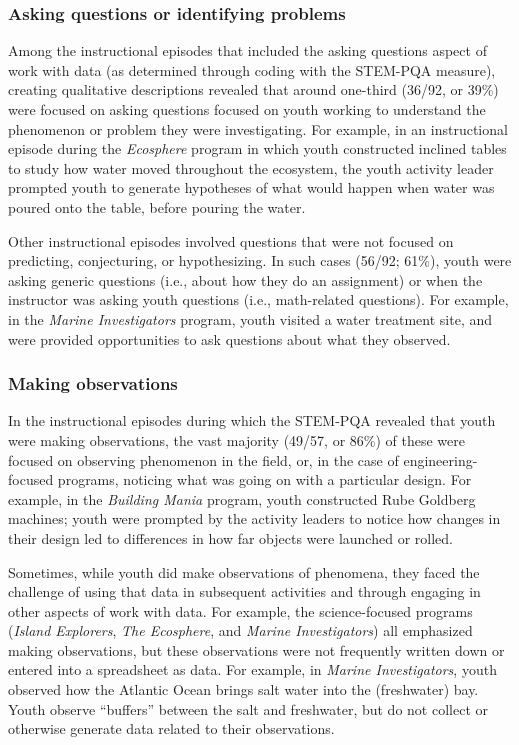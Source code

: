 \documentclass[]{book}
\theoremstyle{definition}
\theoremstyle{definition}
\theoremstyle{definition}
\theoremstyle{remark}
\begin{document}
\subsubsection{Asking questions or identifying
problems}\label{asking-questions-or-identifying-problems}

Among the instructional episodes that included the asking questions
aspect of work with data (as determined through coding with the STEM-PQA
measure), creating qualitative descriptions revealed that around
one-third (36/92, or 39\%) were focused on asking questions focused on
youth working to understand the phenomenon or problem they were
investigating. For example, in an instructional episode during the
\emph{Ecosphere} program in which youth constructed inclined tables to
study how water moved throughout the ecosystem, the youth activity
leader prompted youth to generate hypotheses of what would happen when
water was poured onto the table, before pouring the water.

Other instructional episodes involved questions that were not focused on
predicting, conjecturing, or hypothesizing. In such cases (56/92; 61\%),
youth were asking generic questions (i.e., about how they do an
assignment) or when the instructor was asking youth questions (i.e.,
math-related questions). For example, in the \emph{Marine Investigators}
program, youth visited a water treatment site, and were provided
opportunities to ask questions about what they observed.

\subsubsection{Making observations}\label{making-observations}

In the instructional episodes during which the STEM-PQA revealed that
youth were making observations, the vast majority (49/57, or 86\%) of
these were focused on observing phenomenon in the field, or, in the case
of engineering-focused programs, noticing what was going on with a
particular design. For example, in the \emph{Building Mania} program,
youth constructed Rube Goldberg machines; youth were prompted by the
activity leaders to notice how changes in their design led to
differences in how far objects were launched or rolled.

Sometimes, while youth did make observations of phenomena, they faced
the challenge of using that data in subsequent activities and through
engaging in other aspects of work with data. For example, the
science-focused programs (\emph{Island Explorers}, \emph{The Ecosphere},
and \emph{Marine Investigators}) all emphasized making observations, but
these observations were not frequently written down or entered into a
spreadsheet as data. For example, in \emph{Marine Investigators}, youth
observed how the Atlantic Ocean brings salt water into the (freshwater)
bay. Youth observe ``buffers'' between the salt and freshwater, but do
not collect or otherwise generate data related to their observations.
\end{document}
